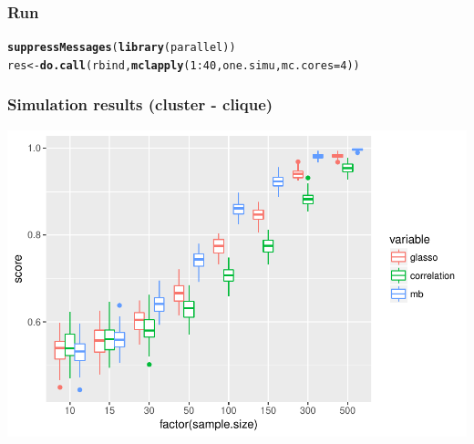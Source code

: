 \documentclass[10pt, c, xcolor=x11names]{beamer}\usepackage[]{graphicx}\usepackage[]{color}
\makeatletter
\newcommand{\hlnum}[1]{\textcolor[rgb]{0.686,0.059,0.569}{#1}}%
\newcommand{\hlopt}[1]{\textcolor[rgb]{0,0,0}{#1}}%
\newcommand{\hlstd}[1]{\textcolor[rgb]{0.345,0.345,0.345}{#1}}%
\newcommand{\hlkwb}[1]{\textcolor[rgb]{0.69,0.353,0.396}{#1}}%
\newcommand{\hlkwc}[1]{\textcolor[rgb]{0.333,0.667,0.333}{#1}}%
\newcommand{\hlkwd}[1]{\textcolor[rgb]{0.737,0.353,0.396}{\textbf{#1}}}%
\newenvironment{kframe}{%
 \def\at@end@of@kframe{}%
 \ifinner\ifhmode%
  \def\at@end@of@kframe{\end{minipage}}%
  \begin{minipage}{\columnwidth}%
 \fi\fi%
 \def\FrameCommand##1{\hskip\@totalleftmargin \hskip-\fboxsep
 \colorbox{shadecolor}{##1}\hskip-\fboxsep
     \hskip-\linewidth \hskip-\@totalleftmargin \hskip\columnwidth}%
 \MakeFramed {\advance\hsize-\width
   \@totalleftmargin\z@ \linewidth\hsize
   \@setminipage}}%
 {\par\unskip\endMakeFramed%
 \at@end@of@kframe}
\newenvironment{knitrout}{}{} %
\makeatother
\begin{document}
\begin{frame}[fragile]
  \frametitle{Run}

\begin{knitrout}\scriptsize
{}\color{fgcolor}\begin{kframe}
\begin{alltt}
\hlkwd{suppressMessages}\hlstd{(}\hlkwd{library}\hlstd{(parallel))}
\hlstd{res} \hlkwb{<-} \hlkwd{do.call}\hlstd{(rbind,} \hlkwd{mclapply}\hlstd{(}\hlnum{1}\hlopt{:}\hlnum{40}\hlstd{, one.simu,} \hlkwc{mc.cores}\hlstd{=}\hlnum{4}\hlstd{))}
\end{alltt}
\end{kframe}
\end{knitrout}

\end{frame}

\begin{frame}[fragile]
  \frametitle{Simulation results (cluster - clique)}

\begin{knitrout}\scriptsize
{}\color{fgcolor}
\includegraphics[width=.8\textwidth]{figures/r_plot_simu_cluster-1} 

\end{knitrout}




\end{frame}
\end{document}
